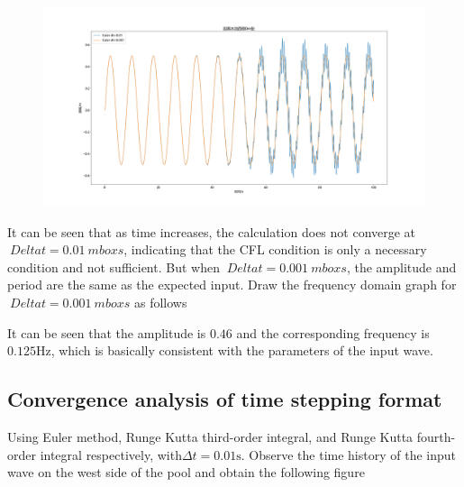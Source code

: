 \documentclass[10pt,a4paper]{article}
\begin{document}
\begin{figure}[htbp]
	\includegraphics[width=\textwidth]{waveGeneration.png}
\end{figure}

It can be seen that as time increases, the calculation does not converge at $\ Delta t=0.01 \ mbox {s} $, indicating that the CFL condition is only a necessary condition and not sufficient. But when $\ Delta t=0.001 \ mbox {s} $, the amplitude and period are the same as the expected input. Draw the frequency domain graph for $\ Delta t=0.001 \ mbox {s} $ as follows

\begin{figure}[htbp]
\end{figure}

It can be seen that the amplitude is $0.46$ and the corresponding frequency is $0.125\mbox{Hz}$, which is basically consistent with the parameters of the input wave.

\subsection{Convergence analysis of time stepping format}\label{sec2}
Using Euler method, Runge Kutta third-order integral, and Runge Kutta fourth-order integral respectively, with$\Delta t=0.01\mbox{s}$. Observe the time history of the input wave on the west side of the pool and obtain the following figure
\end{document}
